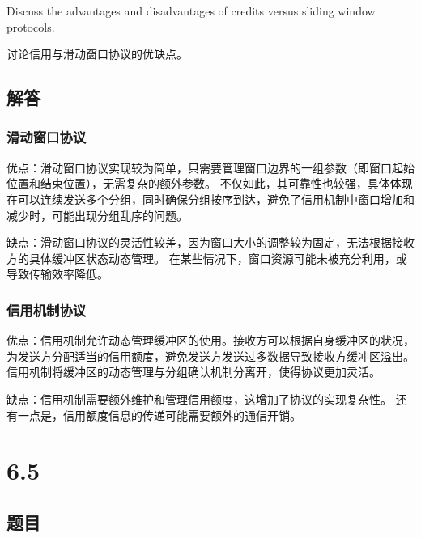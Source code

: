 \documentclass[14pt,a4paper,UTF8,twoside]{article}
\begin{document}
Discuss the advantages and disadvantages of credits versus sliding window protocols.

讨论信用与滑动窗口协议的优缺点。

\subsection*{解答}

\subsubsection*{滑动窗口协议}

\begin{prp}{}{}
    优点：滑动窗口协议实现较为简单，只需要管理窗口边界的一组参数（即窗口起始位置和结束位置），无需复杂的额外参数。
    不仅如此，其可靠性也较强，具体体现在可以连续发送多个分组，同时确保分组按序到达，避免了信用机制中窗口增加和减少时，可能出现分组乱序的问题。    
\end{prp}

\begin{thm}{}{}
    缺点：滑动窗口协议的灵活性较差，因为窗口大小的调整较为固定，无法根据接收方的具体缓冲区状态动态管理。
    在某些情况下，窗口资源可能未被充分利用，或导致传输效率降低。
\end{thm}

\subsubsection*{信用机制协议}

\begin{prp}{}{}
    优点：信用机制允许动态管理缓冲区的使用。接收方可以根据自身缓冲区的状况，为发送方分配适当的信用额度，避免发送方发送过多数据导致接收方缓冲区溢出。
    信用机制将缓冲区的动态管理与分组确认机制分离开，使得协议更加灵活。
\end{prp}

\begin{thm}{}{}
    缺点：信用机制需要额外维护和管理信用额度，这增加了协议的实现复杂性。
    还有一点是，信用额度信息的传递可能需要额外的通信开销。
\end{thm}

\section{6.5}

\subsection*{题目}
\end{document}
